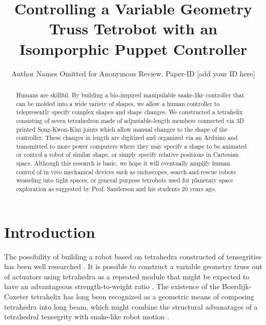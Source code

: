 \documentclass[conference]{article}
\begin{document}
\title{Controlling a Variable Geometry Truss Tetrobot with an Isomporphic Puppet Controller}

\author{Author Names Omitted for Anonymous Review. Paper-ID [add your ID here]}



\maketitle

\begin{abstract}
  Humans are skillful.
  By building a bio-inspired manipulable snake-like controller that can be
  molded into a wide variety of shapes, we allow a human controller to telepresently
  specify complex shapes and shape changes.
  We constructed a tetrahelix consisting of seven tetrahedron made of
  adjustable-length members connected via 3D printed Song-Kwon-Kim joints which
  allow manual changes to the shape of the controller. These changes in length are
  digitized and organized via an Arduino and transmitted to more power computers
  where they may specify a shape to be animated or control a robot of similar shape,
  or simply specify relative positions in Cartesian space. Although this research is basic,
  we hope it will eventually amplify human control of in vivo mechanical devices such as
  endoscopes, search-and-rescue robots weaseling into tight spaces, or general purpose
  tetrobots used for planetary space exploration as suggested by
  Prof. Sanderson and his students 20 years ago.
\end{abstract}



\section{Introduction}

The possibility of building a robot based on tetrahedra constructed of
tensegrities has been well researched \citet{TetrobotBook,NTRT,paul2006,chen2017soft}.
It is possible to construct a variable geometry truss out of actuators
using tetrahedra as a repeated module that might be expected to have
an advantageous strength-to-weight ratio \citet{mikulas1985sequentially,mirletz2014}.
The existence of the Boerdijk-Coxeter tetrahelix \citet{coxeter1985simplicial}
has long been recognized \citet{fuller1982synergetics,graytetrahelix} as a
geometric means of composing tetrahedra into long beam, which
might combine the structural advanatages of a tetrahedral tensegrity with
snake-like robot motion \citet{hirose1993biologically,liljebäck2012snake}.
\end{document}
